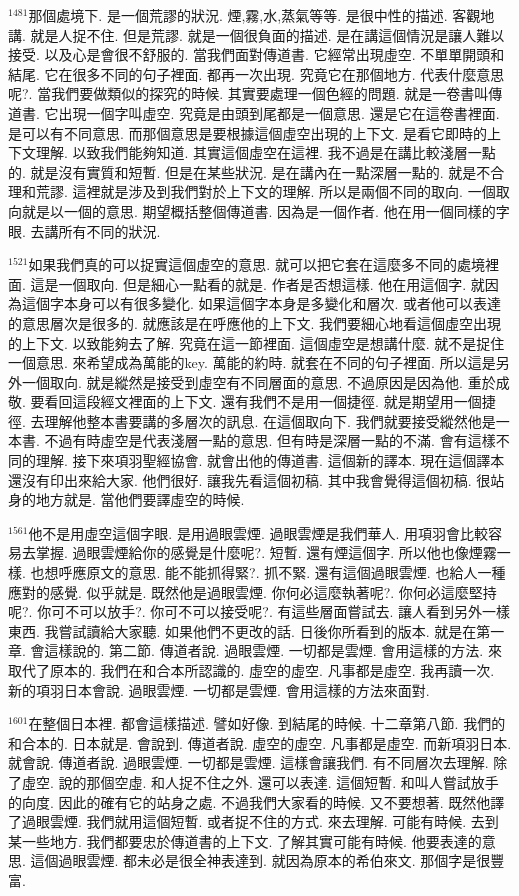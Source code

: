 \documentclass{book}
\begin{document}
$^{1481}$那個處境下.
是一個荒謬的狀況.
煙,霧,水,蒸氣等等.
是很中性的描述.
客觀地講.
就是人捉不住.
但是荒謬.
就是一個很負面的描述.
是在講這個情況是讓人難以接受.
以及心是會很不舒服的.
當我們面對傳道書.
它經常出現虛空.
不單單開頭和結尾.
它在很多不同的句子裡面.
都再一次出現.
究竟它在那個地方.
代表什麼意思呢?.
當我們要做類似的探究的時候.
其實要處理一個色經的問題.
就是一卷書叫傳道書.
它出現一個字叫虛空.
究竟是由頭到尾都是一個意思.
還是它在這卷書裡面.
是可以有不同意思.
而那個意思是要根據這個虛空出現的上下文.
是看它即時的上下文理解.
以致我們能夠知道.
其實這個虛空在這裡.
我不過是在講比較淺層一點的.
就是沒有實質和短暫.
但是在某些狀況.
是在講內在一點深層一點的.
就是不合理和荒謬.
這裡就是涉及到我們對於上下文的理解.
所以是兩個不同的取向.
一個取向就是以一個的意思.
期望概括整個傳道書.
因為是一個作者.
他在用一個同樣的字眼.
去講所有不同的狀況.

$^{1521}$如果我們真的可以捉實這個虛空的意思.
就可以把它套在這麼多不同的處境裡面.
這是一個取向.
但是細心一點看的就是.
作者是否想這樣.
他在用這個字.
就因為這個字本身可以有很多變化.
如果這個字本身是多變化和層次.
或者他可以表達的意思層次是很多的.
就應該是在呼應他的上下文.
我們要細心地看這個虛空出現的上下文.
以致能夠去了解.
究竟在這一節裡面.
這個虛空是想講什麼.
就不是捉住一個意思.
來希望成為萬能的key.
萬能的約時.
就套在不同的句子裡面.
所以這是另外一個取向.
就是縱然是接受到虛空有不同層面的意思.
不過原因是因為他.
重於成敬.
要看回這段經文裡面的上下文.
還有我們不是用一個捷徑.
就是期望用一個捷徑.
去理解他整本書要講的多層次的訊息.
在這個取向下.
我們就要接受縱然他是一本書.
不過有時虛空是代表淺層一點的意思.
但有時是深層一點的不滿.
會有這樣不同的理解.
接下來項羽聖經協會.
就會出他的傳道書.
這個新的譯本.
現在這個譯本還沒有印出來給大家.
他們很好.
讓我先看這個初稿.
其中我會覺得這個初稿.
很站身的地方就是.
當他們要譯虛空的時候.

$^{1561}$他不是用虛空這個字眼.
是用過眼雲煙.
過眼雲煙是我們華人.
用項羽會比較容易去掌握.
過眼雲煙給你的感覺是什麼呢?.
短暫.
還有煙這個字.
所以他也像煙霧一樣.
也想呼應原文的意思.
能不能抓得緊?.
抓不緊.
還有這個過眼雲煙.
也給人一種應對的感覺.
似乎就是.
既然他是過眼雲煙.
你何必這麼執著呢?.
你何必這麼堅持呢?.
你可不可以放手?.
你可不可以接受呢?.
有這些層面嘗試去.
讓人看到另外一樣東西.
我嘗試讀給大家聽.
如果他們不更改的話.
日後你所看到的版本.
就是在第一章.
會這樣說的.
第二節.
傳道者說.
過眼雲煙.
一切都是雲煙.
會用這樣的方法.
來取代了原本的.
我們在和合本所認識的.
虛空的虛空.
凡事都是虛空.
我再讀一次.
新的項羽日本會說.
過眼雲煙.
一切都是雲煙.
會用這樣的方法來面對.

$^{1601}$在整個日本裡.
都會這樣描述.
譬如好像.
到結尾的時候.
十二章第八節.
我們的和合本的.
日本就是.
會說到.
傳道者說.
虛空的虛空.
凡事都是虛空.
而新項羽日本.
就會說.
傳道者說.
過眼雲煙.
一切都是雲煙.
這樣會讓我們.
有不同層次去理解.
除了虛空.
說的那個空虛.
和人捉不住之外.
還可以表達.
這個短暫.
和叫人嘗試放手的向度.
因此的確有它的站身之處.
不過我們大家看的時候.
又不要想著.
既然他譯了過眼雲煙.
我們就用這個短暫.
或者捉不住的方式.
來去理解.
可能有時候.
去到某一些地方.
我們都要忠於傳道書的上下文.
了解其實可能有時候.
他要表達的意思.
這個過眼雲煙.
都未必是很全神表達到.
就因為原本的希伯來文.
那個字是很豐富.
\end{document}
